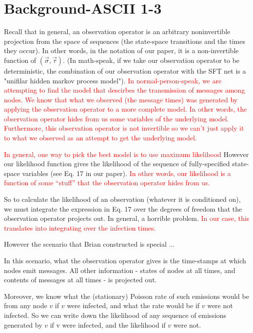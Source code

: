 \documentclass{article}
\begin{document}
\section{Background-ASCII 1-3}

	Recall that in general, an observation operator is an arbitrary
	noninvertible projection from the space of sequences (the state-space
	transitions and the times they occur). In other words, in the notation
	of our paper, it is a non-invertible function of $(\vec{\sigma},
	\vec{\tau})$. (In math-speak, if we take our observation operator to be
	deterministic, the combination of our observation operator with the
	SFT net is a "unifilar hidden markov process model").  \textcolor{red}{In
	normal-person-speak, we are attempting to find the model that descirbes
	the transmission of messages among nodes.  We know that what we
	observed (the message times) was generated  by applying the observation
	operator to a more complete model.  In other words, the observation operator
	hides from us some variables of the underlying model.  Furthermore, this
	observation operator is not invertible so we can't just apply it to what we observed
	as an attempt to get the underlying model.}

	\textcolor{red}{In general, one way to pick the best model is to use maximum
	likelihood} However our likelihood function gives the likelihood of
	the sequence of fully-specified state-space variables (see Eq. 17
	in our paper). \textcolor{red}{In other words, our likelihood is a
	function of some ``stuff'' that the observation operator hides from us.}

	So to calculate the likelihood of an observation (whatever it is
	conditioned on), we must integrate the expression in Eq. 17 over the
	degrees of freedom that the observation operator projects out. In
	general, a horrible problem.  \textcolor{red}{In our case, this translates
	into integrating over the infection times.} 

	However the scenario that Brian constructed is special ...

	In this scenario, what the observation operator gives is the
	time-stamps at which nodes emit messages. All other information -
	states of nodes at all times, and contents of messages at all times -
	is projected out.

	Moreover, we know what the (stationary) Poisson rate of such emissions
	would be from any node $v$ if $v$ were infected, and what the rate would
	be if $v$ were not infected. So we can write down the likelihood of any
	sequence of emissions generated by $v$ if v were infected, and the
	likelihood if $v$ were not.
\end{document}

